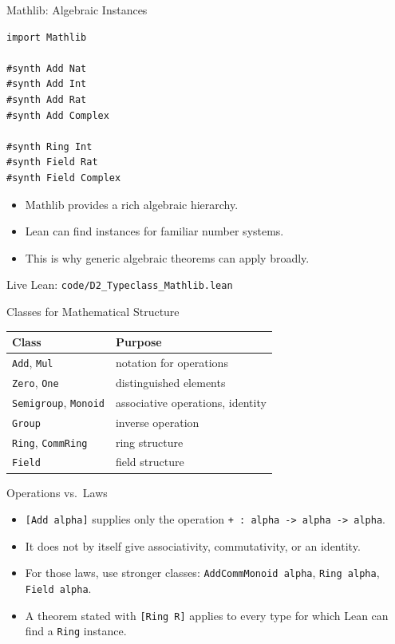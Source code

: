 ﻿\documentclass[aspectratio=169,11pt]{beamer}
\newcommand{\leanfile}[1]{\vfill{\small\color{gray}Live Lean: \texttt{#1}}}
\begin{document}
\begin{frame}[fragile]{Mathlib: Algebraic Instances}
  \begin{lstlisting}
import Mathlib

#synth Add Nat
#synth Add Int
#synth Add Rat
#synth Add Complex

#synth Ring Int
#synth Field Rat
#synth Field Complex
  \end{lstlisting}

  \begin{itemize}
    \item Mathlib provides a rich algebraic hierarchy.
    \item Lean can find instances for familiar number systems.
    \item This is why generic algebraic theorems can apply broadly.
  \end{itemize}

  \leanfile{code/D2\_Typeclass\_Mathlib.lean}
\end{frame}

\begin{frame}{Classes for Mathematical Structure}
  \begin{tabular}{@{}ll@{}}
    \toprule
    Class & Purpose \\
    \midrule
    \texttt{Add}, \texttt{Mul} & notation for operations \\
    \texttt{Zero}, \texttt{One} & distinguished elements \\
    \texttt{Semigroup}, \texttt{Monoid} & associative operations, identity \\
    \texttt{Group} & inverse operation \\
    \texttt{Ring}, \texttt{CommRing} & ring structure \\
    \texttt{Field} & field structure \\
    \bottomrule
  \end{tabular}
\end{frame}

\begin{frame}{Operations vs.\ Laws}
  \begin{itemize}
    \item \texttt{[Add alpha]} supplies only the operation \texttt{+ : alpha -> alpha -> alpha}.
    \item It does not by itself give associativity, commutativity, or an identity.
    \item For those laws, use stronger classes: \texttt{AddCommMonoid alpha}, \texttt{Ring alpha}, \texttt{Field alpha}.
    \item A theorem stated with \texttt{[Ring R]} applies to every type for which Lean can find a \texttt{Ring} instance.
  \end{itemize}
\end{frame}
\end{document}
